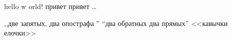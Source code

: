 \documentclass[12pt]{article}
\begin{document}
\pagestyle{empty}

	hello w orld! привет привет \ldots
	
,,две запятых, два опострафа ''
``два обратных два прямых''
<<кавычки елочки>>
\end{document}
